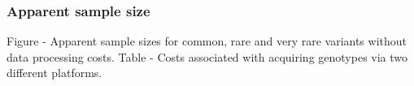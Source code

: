 






\subsubsection{Apparent sample size}


Figure - Apparent sample sizes for common, rare and very rare variants without data processing costs. 
Table - Costs associated with acquiring genotypes via two different platforms.